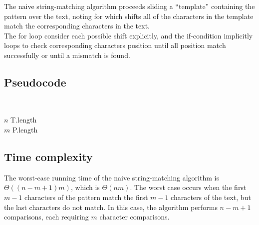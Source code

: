 \documentclass[11pt]{article}
\begin{document}
            The naive string-matching algorithm proceeds sliding a ``template'' containing the pattern over the text, noting for which shifts
            all of the characters in the template match the corresponding characters in the text. \\
            The for loop consider each possible shift explicitly, and the if-condition implicitly loops to check corresponding characters
            position until all position match successfully or until a mismatch is found.

        \subsection{Pseudocode} \label{subsec:naive_pseudocode}

            \begin{algorithm}[H] \label{alg:naive_string_matching_algorithm}
            \SetAlgoLined
            \vspace{0.5em}
             \\
            \vspace{0.5em}

                $n$ \leftarrow T.length\; \\
                $m$ \leftarrow P.length\; \\

            \end{algorithm}

        \subsection{Time complexity} \label{subsec:naive_time_complexity}

            The worst-case running time of the naive string-matching algorithm is $\Theta((n - m + 1)m)$, which is $\Theta(nm)$.
            The worst case occurs when the first $m - 1$ characters of the pattern match the first $m - 1$ characters of the text, but the last characters do not match.
            In this case, the algorithm performs $n - m + 1$ comparisons, each requiring $m$ character comparisons. \\
\end{document}

